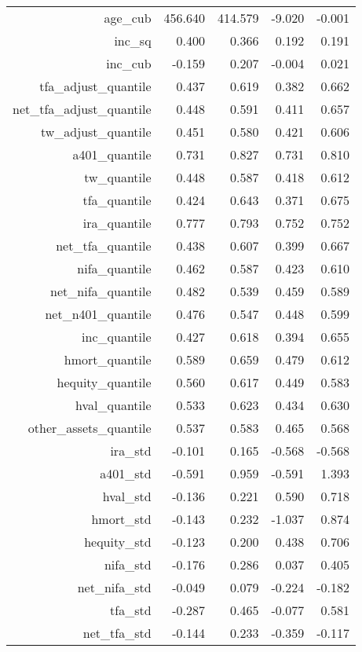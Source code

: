 \begin{table}[ht]
\begin{tabular}{rrrrr}
  age\_cub & 456.640 & 414.579 & -9.020 & -0.001 \\ 
  inc\_sq & 0.400 & 0.366 & 0.192 & 0.191 \\ 
  inc\_cub & -0.159 & 0.207 & -0.004 & 0.021 \\ 
  tfa\_adjust\_quantile & 0.437 & 0.619 & 0.382 & 0.662 \\ 
  net\_tfa\_adjust\_quantile & 0.448 & 0.591 & 0.411 & 0.657 \\ 
  tw\_adjust\_quantile & 0.451 & 0.580 & 0.421 & 0.606 \\ 
  a401\_quantile & 0.731 & 0.827 & 0.731 & 0.810 \\ 
  tw\_quantile & 0.448 & 0.587 & 0.418 & 0.612 \\ 
  tfa\_quantile & 0.424 & 0.643 & 0.371 & 0.675 \\ 
  ira\_quantile & 0.777 & 0.793 & 0.752 & 0.752 \\ 
  net\_tfa\_quantile & 0.438 & 0.607 & 0.399 & 0.667 \\ 
  nifa\_quantile & 0.462 & 0.587 & 0.423 & 0.610 \\ 
  net\_nifa\_quantile & 0.482 & 0.539 & 0.459 & 0.589 \\ 
  net\_n401\_quantile & 0.476 & 0.547 & 0.448 & 0.599 \\ 
  inc\_quantile & 0.427 & 0.618 & 0.394 & 0.655 \\ 
  hmort\_quantile & 0.589 & 0.659 & 0.479 & 0.612 \\ 
  hequity\_quantile & 0.560 & 0.617 & 0.449 & 0.583 \\ 
  hval\_quantile & 0.533 & 0.623 & 0.434 & 0.630 \\ 
  other\_assets\_quantile & 0.537 & 0.583 & 0.465 & 0.568 \\ 
  ira\_std & -0.101 & 0.165 & -0.568 & -0.568 \\ 
  a401\_std & -0.591 & 0.959 & -0.591 & 1.393 \\ 
  hval\_std & -0.136 & 0.221 & 0.590 & 0.718 \\ 
  hmort\_std & -0.143 & 0.232 & -1.037 & 0.874 \\ 
  hequity\_std & -0.123 & 0.200 & 0.438 & 0.706 \\ 
  nifa\_std & -0.176 & 0.286 & 0.037 & 0.405 \\ 
  net\_nifa\_std & -0.049 & 0.079 & -0.224 & -0.182 \\ 
  tfa\_std & -0.287 & 0.465 & -0.077 & 0.581 \\ 
  net\_tfa\_std & -0.144 & 0.233 & -0.359 & -0.117 \\ 

\end{tabular}
\end{table}
